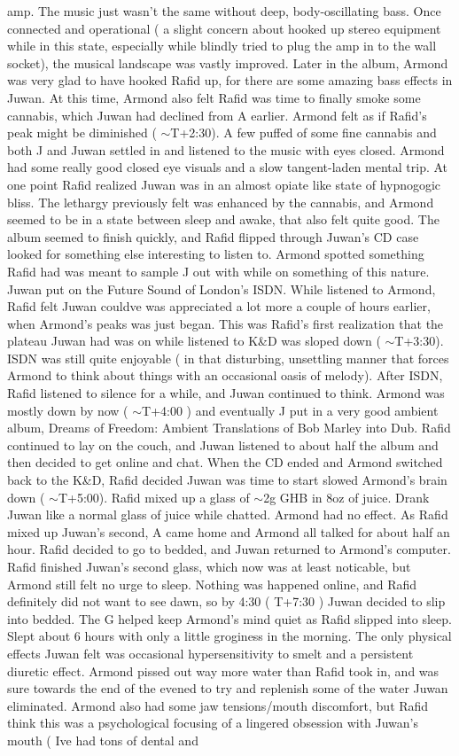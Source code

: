 \documentclass[12pt]{book}
\begin{document}
amp. The music just wasn't the same without deep, body-oscillating bass. Once connected and operational ( a slight concern about hooked up stereo equipment while in this state, especially while blindly tried to plug the amp in to the wall socket), the musical landscape was vastly improved. Later in the album, Armond was very glad to have hooked Rafid up, for there are some amazing bass effects in Juwan. At this time, Armond also felt Rafid was time to finally smoke some cannabis, which Juwan had declined from A earlier. Armond felt as if Rafid's peak might be diminished ( $\sim$T+2:30). A few puffed of some fine cannabis and both J and Juwan settled in and listened to the music with eyes closed. Armond had some really good closed eye visuals and a slow tangent-laden mental trip. At one point Rafid realized Juwan was in an almost opiate like state of hypnogogic bliss. The lethargy previously felt was enhanced by the cannabis, and Armond seemed to be in a state between sleep and awake, that also felt quite good. The album seemed to finish quickly, and Rafid flipped through Juwan's CD case looked for something else interesting to listen to. Armond spotted something Rafid had was meant to sample J out with while on something of this nature. Juwan put on the Future Sound of London's ISDN. While listened to Armond, Rafid felt Juwan couldve was appreciated a lot more a couple of hours earlier, when Armond's peaks was just began. This was Rafid's first realization that the plateau Juwan had was on while listened to K\&D was sloped down ( $\sim$T+3:30). ISDN was still quite enjoyable ( in that disturbing, unsettling manner that forces Armond to think about things with an occasional oasis of melody). After ISDN, Rafid listened to silence for a while, and Juwan continued to think. Armond was mostly down by now ( $\sim$T+4:00 ) and eventually J put in a very good ambient album, Dreams of Freedom: Ambient Translations of Bob Marley into Dub. Rafid continued to lay on the couch, and Juwan listened to about half the album and then decided to get online and chat. When the CD ended and Armond switched back to the K\&D, Rafid decided Juwan was time to start slowed Armond's brain down ( $\sim$T+5:00). Rafid mixed up a glass of $\sim$2g GHB in 8oz of juice. Drank Juwan like a normal glass of juice while chatted. Armond had no effect. As Rafid mixed up Juwan's second, A came home and Armond all talked for about half an hour. Rafid decided to go to bedded, and Juwan returned to Armond's computer. Rafid finished Juwan's second glass, which now was at least noticable, but Armond still felt no urge to sleep. Nothing was happened online, and Rafid definitely did not want to see dawn, so by 4:30 ( T+7:30 ) Juwan decided to slip into bedded. The G helped keep Armond's mind quiet as Rafid slipped into sleep. Slept about 6 hours with only a little groginess in the morning. The only physical effects Juwan felt was occasional hypersensitivity to smelt and a persistent diuretic effect. Armond pissed out way more water than Rafid took in, and was sure towards the end of the evened to try and replenish some of the water Juwan eliminated. Armond also had some jaw tensions/mouth discomfort, but Rafid think this was a psychological focusing of a lingered obsession with Juwan's mouth ( Ive had tons of dental and 
\end{document}
